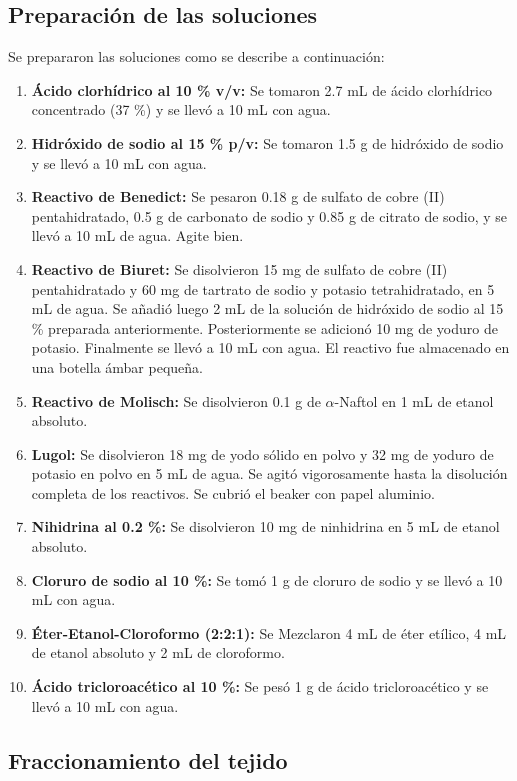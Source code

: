 \documentclass[fleqn,10pt]{SelfArx}
\begin{document}
	\subsection{Preparación de las soluciones}
		Se prepararon las soluciones como se describe a continuación:
		\begin{enumerate}
			\item \textbf{Ácido clorhídrico al 10 \% v/v:} Se tomaron 2.7 mL de ácido clorhídrico concentrado (37 \%) y se llevó a 10 mL con agua.
			\item \textbf{Hidróxido de sodio al 15 \% p/v:} Se tomaron 1.5 g de hidróxido de sodio y se llevó a 10 mL con agua.
			\item \textbf{Reactivo de Benedict:} Se pesaron 0.18 g de sulfato de cobre (II) pentahidratado, 0.5 g de carbonato de sodio y 0.85 g de citrato de sodio, y se llevó a 10 mL de agua. Agite bien.
			\item \textbf{Reactivo de Biuret:} Se disolvieron 15 mg de sulfato de cobre (II) pentahidratado y 60 mg de tartrato de sodio y potasio tetrahidratado, en 5 mL de agua. Se añadió luego 2 mL de la solución de hidróxido de sodio al 15 \% preparada anteriormente. Posteriormente se adicionó 10 mg de yoduro de potasio. Finalmente se llevó a 10 mL con agua. El reactivo fue almacenado en una botella ámbar pequeña.
			\item \textbf{Reactivo de Molisch:} Se disolvieron 0.1 g de $\alpha$-Naftol en 1 mL de etanol absoluto.
			\item \textbf{Lugol:} Se disolvieron 18 mg de yodo sólido en polvo y 32 mg de yoduro de potasio en polvo en 5 mL de agua. Se agitó vigorosamente hasta la disolución completa de los reactivos. Se cubrió el beaker con papel aluminio.
			\item \textbf{Nihidrina al 0.2 \%:} Se disolvieron 10 mg de ninhidrina en 5 mL de etanol absoluto.
			\item \textbf{Cloruro de sodio al 10 \%:} Se tomó 1 g de cloruro de sodio y se llevó a 10 mL con agua.
			\item \textbf{Éter-Etanol-Cloroformo (2:2:1):} Se Mezclaron 4 mL de éter etílico, 4 mL de etanol absoluto y 2
			mL de cloroformo.
			\item \textbf{Ácido tricloroacético al 10 \%:} Se pesó 1 g de ácido tricloroacético y se llevó a 10 mL con agua.
		\end{enumerate}
	\subsection{Fraccionamiento del tejido}
		
\end{document}
